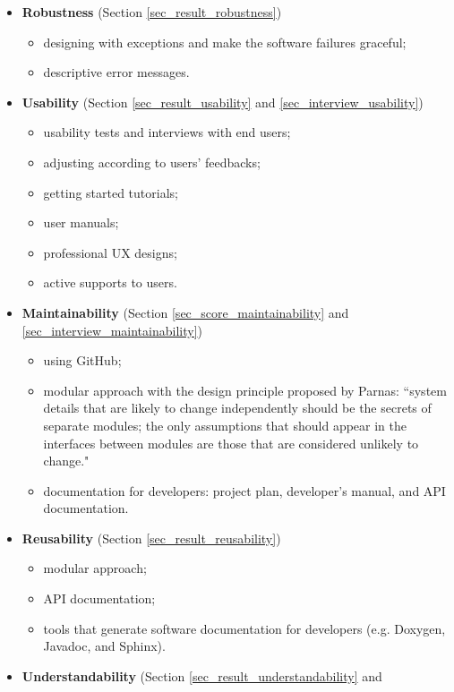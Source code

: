 \documentclass[final, 3p, times, authoryear]{elsarticle}
\begin{document}
\begin{itemize}
\begin{itemize}
\end{itemize}
\item \textbf{Robustness} (Section \ref{sec_result_robustness})
\begin{itemize}
    \item designing with exceptions and make the software failures graceful;
    \item descriptive error messages.
\end{itemize}
\item \textbf{Usability} (Section \ref{sec_result_usability} and \ref{sec_interview_usability})
\begin{itemize}
    \item usability tests and interviews with end users;
    \item adjusting according to users’ feedbacks;
    \item getting started tutorials;
    \item user manuals;
    \item professional UX designs;
    \item active supports to users.
\end{itemize}
\item \textbf{Maintainability} (Section \ref{sec_score_maintainability} and
\ref{sec_interview_maintainability})
\begin{itemize}
    \item using GitHub;
    \item modular approach with the design principle proposed by Parnas:
    ``system details that are likely to change independently should be the
    secrets of separate modules; the only assumptions that should appear in the
    interfaces between modules are those that are considered unlikely to
    change." \citep{ParnasEtAl2000}
    \item documentation for developers: project plan, developer’s manual, and API documentation.
\end{itemize}
\item \textbf{Reusability} (Section \ref{sec_result_reusability})
\begin{itemize}
    \item modular approach;
    \item API documentation;
    \item tools that generate software documentation for developers (e.g.
    Doxygen, Javadoc, and Sphinx).
\end{itemize}
\item \textbf{Understandability} (Section \ref{sec_result_understandability} and

\end{itemize}
\end{document}
